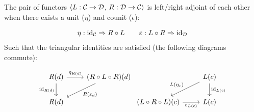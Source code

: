 \begin{definition}
  The pair of functors $\langle L: \mathcal{C}\to \mathcal{D}$, $R: \mathcal{D}\to \mathcal{C}\rangle$ is left/right adjoint of
  each other when there exists a unit ($\eta$) and counit ($\epsilon$):
  \parencite{leinster:basic_category_theory}

  \[
    \begin{gathered}
      \eta: \mathrm{id}_{\mathcal{C}} \Rightarrow R \circ L
    \end{gathered}
    \qquad
    \begin{gathered}
      \varepsilon: L \circ R \Rightarrow \mathrm{id}_{\mathcal{D}}
    \end{gathered}
  \]
  Such that the triangular identities are satisfied (the following diagrams
  commute):

  \[\begin{tikzcd}[ampersand replacement=\&]
    {R(d)} \& {(R\circ L\circ R)(d)} \\
    {R(d)}
    \arrow["{\eta_{R(d)}}", from=1-1, to=1-2]
    \arrow["{R(\varepsilon_d)}", from=1-2, to=2-1]
    \arrow["{\id_{R(d)}}"', from=1-1, to=2-1]
  \end{tikzcd}
  \begin{tikzcd}[ampersand replacement=\&]
    \& {L(c)} \\
    {(L\circ R\circ L)(c)} \& {L(c)}
    \arrow["{L(\eta_c)}"', from=1-2, to=2-1]
    \arrow["{\varepsilon_{L(c)}}"', from=2-1, to=2-2]
    \arrow["{\id_{L(c)}}", from=1-2, to=2-2]
  \end{tikzcd}
  \]
\end{definition}

